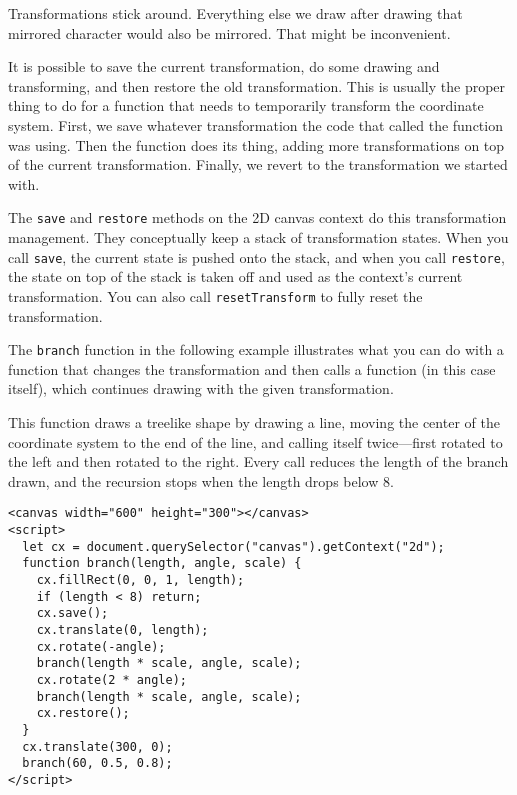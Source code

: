 Transformations stick around. Everything else we draw after drawing that mirrored character would also be mirrored. That might be inconvenient.

It is possible to save the current transformation, do some drawing and transforming, and then restore the old transformation. This is usually the proper thing to do for a function that needs to temporarily transform the coordinate system. First, we save whatever transformation the code that called the function was using. Then the function does its thing, adding more transformations on top of the current transformation. Finally, we revert to the transformation we started with.

The \lstinline`save` and \lstinline`restore` methods on the 2D canvas context do this transformation management. They conceptually keep a stack of transformation states. When you call \lstinline`save`, the current state is pushed onto the stack, and when you call \lstinline`restore`, the state on top of the stack is taken off and used as the context's current transformation. You can also call \lstinline`resetTransform` to fully reset the transformation.

The \lstinline`branch` function in the following example illustrates what you can do with a function that changes the transformation and then calls a function (in this case itself), which continues drawing with the given transformation.

This function draws a treelike shape by drawing a line, moving the center of the coordinate system to the end of the line, and calling itself twice—first rotated to the left and then rotated to the right. Every call reduces the length of the branch drawn, and the recursion stops when the length drops below 8.

\begin{lstlisting}
<canvas width="600" height="300"></canvas>
<script>
  let cx = document.querySelector("canvas").getContext("2d");
  function branch(length, angle, scale) {
    cx.fillRect(0, 0, 1, length);
    if (length < 8) return;
    cx.save();
    cx.translate(0, length);
    cx.rotate(-angle);
    branch(length * scale, angle, scale);
    cx.rotate(2 * angle);
    branch(length * scale, angle, scale);
    cx.restore();
  }
  cx.translate(300, 0);
  branch(60, 0.5, 0.8);
</script>
\end{lstlisting}
\noindent

